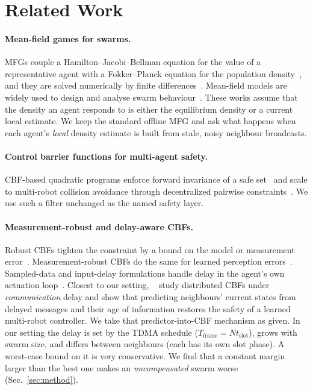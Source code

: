 \documentclass{article}
\newcommand{\Tf}{T_{\mathrm{frame}}}
\newcommand{\tslot}{t_{\mathrm{slot}}}
\begin{document}
\section{Related Work}

\paragraph{Mean-field games for swarms.}
MFGs couple a Hamilton--Jacobi--Bellman equation for the value of a representative agent with a
Fokker--Planck equation for the population
density~\cite{lasry2007mean,huang2006large}, and they are solved numerically by finite
differences~\cite{achdou2010mean}. Mean-field models are widely used to design and analyse
swarm behaviour~\cite{elamvazhuthi2019mean}. These works assume that the density an agent responds
to is either the equilibrium density or a current local estimate. We keep the standard offline
MFG and ask what happens when each agent's \emph{local} density estimate is built from stale,
noisy neighbour broadcasts.

\paragraph{Control barrier functions for multi-agent safety.}
CBF-based quadratic programs enforce forward invariance of a safe set~\cite{ames2017cbf,ames2019cbf}
and scale to multi-robot collision avoidance through decentralized pairwise
constraints~\cite{borrmann2015control,wang2017safety}. We use such a filter unchanged as the
named safety layer.

\paragraph{Measurement-robust and delay-aware CBFs.}
Robust CBFs tighten the constraint by a bound on the model or measurement
error~\cite{jankovic2018robust}. Measurement-robust CBFs do the same for learned perception
errors~\cite{dean2020guaranteeing,cosner2021measurement}. Sampled-data and input-delay
formulations handle delay in the agent's own actuation
loop~\cite{singletary2020sampled,molnar2023delay}. Closest to our setting,
\citeauthor{ballotta2025safe}~ study distributed CBFs under
\emph{communication} delay and show that predicting neighbours' current states from delayed
messages and their age of information restores the safety of a learned multi-robot controller.
We take that predictor-into-CBF mechanism as given. In our setting the delay is set by the TDMA
schedule ($\Tf = N\tslot$), grows with swarm size, and differs between neighbours (each has its own
slot phase). A worst-case bound on it is very conservative. We find that a constant margin larger than the best one makes an
\emph{uncompensated} swarm worse (Sec.~\ref{sec:method}).
\end{document}
